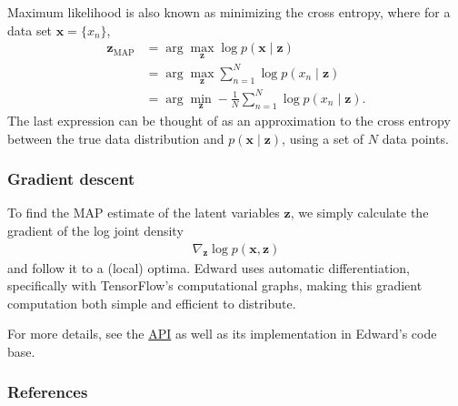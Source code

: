 Maximum likelihood is also known as minimizing the cross entropy, where
for a data set $\mathbf{x}=\{x_n\}$,
\begin{align*}
  \mathbf{z}_\text{MAP}
  &=
  \arg \max_\mathbf{z}
  \log p(\mathbf{x}\mid \mathbf{z})
  \\
  &=
  \arg \max_\mathbf{z}
  \sum_{n=1}^N \log p(x_n\mid \mathbf{z})
  \\
  &=
  \arg \min_\mathbf{z}
  -\frac{1}{N}\sum_{n=1}^N \log p(x_n\mid \mathbf{z}).
\end{align*}
The last expression can be thought of as an approximation to the cross
entropy between the true data distribution and $p(\mathbf{x}\mid \mathbf{z})$,
using a set of $N$ data points.

\subsubsection{Gradient descent}

To find the MAP estimate of the latent variables $\mathbf{z}$, we simply
calculate the gradient of the log joint density
\begin{align*}
  \nabla_\mathbf{z}
  \log p(\mathbf{x}, \mathbf{z})
\end{align*}
and follow it to a (local) optima.
Edward uses automatic differentiation, specifically with TensorFlow's
computational graphs, making this gradient computation both simple and
efficient to distribute.

For more details, see the \href{/api/}{API} as well as its
implementation in Edward's code base.

\subsubsection{References}\label{references}
